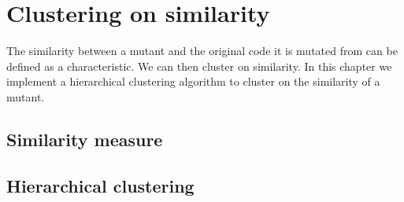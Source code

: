 \documentclass[../main]{subfiles}
\begin{document}
\chapter{Clustering on similarity}
\label{ch:clustering_similarity}
The similarity between a mutant and the original code it is mutated from can be defined as a characteristic. 
We can then cluster on similarity. 
In this chapter we implement a hierarchical clustering algorithm to cluster on the similarity of a mutant.

\section{Similarity measure}

\section{Hierarchical clustering}
\end{document}
